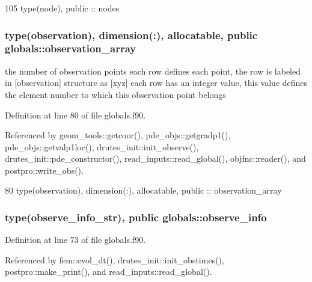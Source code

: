 \begin{DoxyCode}
105   \textcolor{keywordtype}{type}(node), \textcolor{keywordtype}{public} :: nodes
\end{DoxyCode}
\subsubsection[{observation\+\_\+array}]{\setlength{\rightskip}{0pt plus 5cm}type({\bf observation}), dimension(\+:), allocatable, public globals\+::observation\+\_\+array}\label{namespaceglobals_a4dd71ee8c2e6e8e237f73545278811b7}


the number of observation points each row defines each point, the row is labeled in [observation] structure as [xyz] each row has an integer value, this value defines the element number to which this observation point belongs 



Definition at line 80 of file globals.\+f90.



Referenced by geom\+\_\+tools\+::getcoor(), pde\+\_\+objs\+::getgradp1(), pde\+\_\+objs\+::getvalp1loc(), drutes\+\_\+init\+::init\+\_\+observe(), drutes\+\_\+init\+::pde\+\_\+constructor(), read\+\_\+inputs\+::read\+\_\+global(), objfnc\+::reader(), and postpro\+::write\+\_\+obs().


\begin{DoxyCode}
80   \textcolor{keywordtype}{type}(observation),  \textcolor{keywordtype}{dimension(:)}, \textcolor{keywordtype}{allocatable}, \textcolor{keywordtype}{public} :: observation_array
\end{DoxyCode}
\subsubsection[{observe\+\_\+info}]{\setlength{\rightskip}{0pt plus 5cm}type({\bf observe\+\_\+info\+\_\+str}), public globals\+::observe\+\_\+info}\label{namespaceglobals_afeed5705141157c5ff38122ac6983db3}


Definition at line 73 of file globals.\+f90.



Referenced by fem\+::evol\+\_\+dt(), drutes\+\_\+init\+::init\+\_\+obstimes(), postpro\+::make\+\_\+print(), and read\+\_\+inputs\+::read\+\_\+global().


